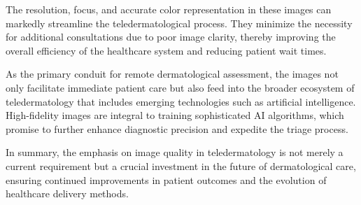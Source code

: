 The resolution, focus, and accurate color representation in these images can markedly streamline the teledermatological process. They minimize the necessity for additional consultations due to poor image clarity, thereby improving the overall efficiency of the healthcare system and reducing patient wait times.\par
\vspace{\baselineskip}
\noindent

As the primary conduit for remote dermatological assessment, the images not only facilitate immediate patient care but also feed into the broader ecosystem of teledermatology that includes emerging technologies such as artificial intelligence. High-fidelity images are integral to training sophisticated AI algorithms, which promise to further enhance diagnostic precision and expedite the triage process.\par
\vspace{\baselineskip}
\noindent

In summary, the emphasis on image quality in teledermatology is not merely a current requirement but a crucial investment in the future of dermatological care, ensuring continued improvements in patient outcomes and the evolution of healthcare delivery methods.

